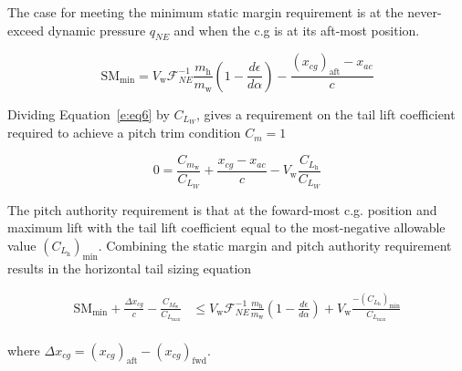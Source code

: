 \documentclass[]{aiaa-tc}%
\begin{document}
The case for meeting the minimum static margin requirement is at the never-exceed dynamic pressure $q_{NE}$ and when the c.g is at its aft-most position.

\begin{equation}
    \text{SM}_{\text{min}} = V_{\text{w}} \mathcal{F}_{NE}^{-1} \frac{m_{\text{h}}}{m_{\text{w}}} \left( 1 - \frac{d\epsilon}{d\alpha}\right) - \frac{(x_{cg})_{\text{aft}} - x_{ac}}{c} 
\end{equation}

Dividing Equation~\eqref{e:eq6} by $C_{L_W}$, gives a requirement on the tail lift coefficient required to achieve a pitch trim condition $C_m=1$

\begin{equation}
    0 = \frac{C_{m_{\text{w}}}}{C_{L_W}} + \frac{x_{cg} - x_{ac}}{c} - V_{\text{w}} \frac{C_{L_{\text{h}}}}{C_{L_W}}
\end{equation}

The pitch authority requirement is that at the foward-most c.g. position and maximum lift with the tail lift coefficient equal to the most-negative allowable value $(C_{L_{\text{h}}})_{\text{min}}$. Combining the static margin and pitch authority requirement results in the horizontal tail sizing equation 

\begin{align}
    \text{SM}_{\text{min}} + \frac{\Delta x_{cg}}{c} - \frac{C_{M_{\text{w}}}}{C_{L_{\text{max}}}} &\leq V_{\text{w}} \mathcal{F}_{NE}^{-1} \frac{m_{\text{h}}}{m_{\text{w}}} \left( 1 - \frac{d\epsilon}{d\alpha}\right) + V_{\text{w}} \frac{-(C_{L_{\text{h}}})_{\text{min}}}{C_{L_{\text{max}}}} \\
\end{align}

where $\Delta x_{cg} = (x_{cg})_{\text{aft}} - (x_{cg})_{\text{fwd}}$.
\end{document}
